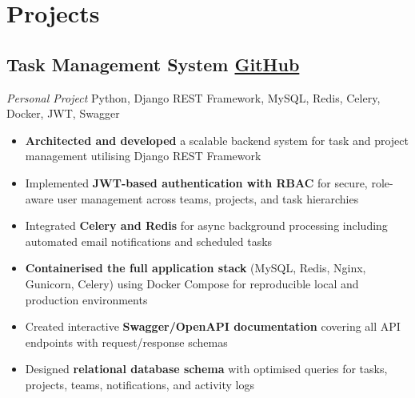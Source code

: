 \documentclass[a4paper,11.5pt]{article}
\newcommand{\h}[1]{\textbf{\textcolor{hgray}{#1}}}
\begin{document}
\vspace{0.4em}

\section*{Projects}

\subsection*{Task Management System \hfill \href{https://github.com/sakshi-suryawanshi/task-management-system}{GitHub}}
\textit{Personal Project} \textbar{} Python, Django REST Framework, MySQL, Redis, Celery, Docker, JWT, Swagger
\begin{itemize}[topsep=2pt]
  \item \h{Architected and developed} a scalable backend system for task and project management utilising Django REST Framework
  \item Implemented \h{JWT-based authentication with RBAC} for secure, role-aware user management across teams, projects, and task hierarchies
  \item Integrated \h{Celery and Redis} for async background processing including automated email notifications and scheduled tasks
  \item \h{Containerised the full application stack} (MySQL, Redis, Nginx, Gunicorn, Celery) using Docker Compose for reproducible local and production environments
  \item Created interactive \h{Swagger/OpenAPI documentation} covering all API endpoints with request/response schemas
  \item Designed \h{relational database schema} with optimised queries for tasks, projects, teams, notifications, and activity logs
\end{itemize}

\vspace{0.15em}
\end{document}
